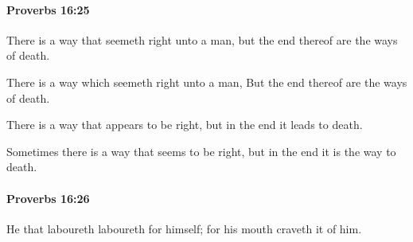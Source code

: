 		\paragraph{Proverbs 16:25} %
			\label{PROVERBS-16-25}

			There is a way that seemeth right unto a man, but the end thereof are the ways of death.

			\begin{versebox}
					\item[BHS] 
					\item[ASV] There is a way which seemeth right unto a man, But the end thereof are the ways of death.
					\item[NIV] There is a way that appears to be right, but in the end it leads to death.
					\item[NRSV] Sometimes there is a way that seems to be right, but in the end it is the way to death.
			\end{versebox}

		\paragraph{Proverbs 16:26} %
			\label{PROVERBS-16-26}

			He that laboureth laboureth for himself; for his mouth craveth it of him.

